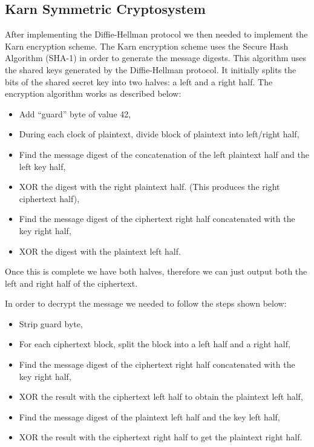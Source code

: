 \documentclass[10pt]{article}
\begin{document}
\subsection{Karn Symmetric Cryptosystem}
After implementing the Diffie-Hellman protocol we then needed to implement the
Karn encryption scheme. The Karn encryption scheme uses the Secure Hash
Algorithm (SHA-1) in order to generate the message digests. This algorithm uses
the shared keys generated by the Diffie-Hellman protocol. It initially splits
the bits of the shared secret key into two halves: a left and a right half. The
encryption algorithm works as described below:
\begin{itemize}
    \item Add ``guard'' byte of value 42,
    \item During each clock of plaintext, divide block of plaintext into
          left/right half,
    \item Find the message digest of the concatenation of the left plaintext
          half and the left key half,
    \item XOR the digest with the right plaintext half. (This produces the
          right ciphertext half),
    \item Find the message digest of the ciphertext right half concatenated
          with the key right half,
    \item XOR the digest with the plaintext left half.
\end{itemize}
Once this is complete we have both halves, therefore we can just output both the
left and right half of the ciphertext.

In order to decrypt the message we needed to follow the steps shown below:
\begin{itemize}
    \item Strip guard byte,
    \item For each ciphertext block, split the block into a left half and a
          right half,
    \item Find the message digest of the ciphertext right half concatenated
          with the key right half,
    \item XOR the result with the ciphertext left half to obtain the plaintext
          left half,
    \item Find the message digest of the plaintext left half and the key left
          half,
    \item XOR the result with the ciphertext right half to get the plaintext
          right half.
\end{itemize}
\end{document}
